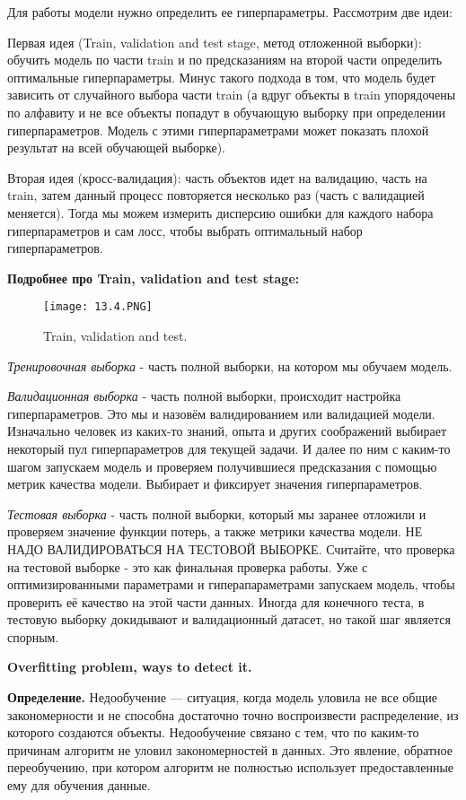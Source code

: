 Для работы модели нужно определить ее гиперпараметры. Рассмотрим две идеи: 

Первая идея (Train, validation and test stage, метод отложенной выборки): обучить модель по части train и по предсказаниям на второй части определить оптимальные гиперпараметры. Минус такого подхода в том, что модель будет зависить от случайного выбора части train (а вдруг объекты в train упорядочены по алфавиту и не все объекты попадут в обучающую выборку при определении гиперпараметров. Модель с этими гиперпараметрами может показать плохой результат на всей обучающей выборке).

Вторая идея (кросс-валидация): часть объектов идет на валидацию, часть на train, затем
данный процесс повторяется несколько раз (часть с валидацией меняется). Тогда мы можем измерить
дисперсию ошибки для каждого набора гиперпараметров и сам лосс, чтобы выбрать оптимальный набор гиперпараметров.

\textbf{Подробнее про Train, validation and test stage:}

\begin{figure}[h]
\centering
\texttt{[image: 13.4.PNG]}
\caption{Train, validation and test.}
\end{figure}

\textit{Тренировочная выборка} - часть полной выборки, на котором мы обучаем модель. 

\textit{Валидационная выборка} - часть полной выборки, происходит настройка гиперпараметров. Это мы и назовём валидированием или валидацией модели. Изначально человек из каких-то знаний, опыта и других соображений выбирает некоторый пул гиперпараметров для текущей задачи. И далее по ним с каким-то шагом запускаем модель и проверяем получившиеся
предсказания с помощью метрик качества модели. Выбирает и фиксирует значения гиперпараметров.

\textit{Тестовая выборка} - часть полной выборки, который мы заранее отложили и проверяем значение функции потерь, а также метрики качества модели.
НЕ НАДО ВАЛИДИРОВАТЬСЯ НА ТЕСТОВОЙ ВЫБОРКЕ. Считайте, что проверка на тестовой выборке - это как финальная проверка работы. Уже с оптимизированными параметрами и гиперапараметрами запускаем модель, чтобы проверить её качество на этой части данных. Иногда для конечного теста, в тестовую выборку докидывают и валидационный датасет, но такой шаг является спорным.

\textbf{Overfitting problem, ways to detect it.}

\textbf{Определение.} Недообучение — ситуация, когда модель уловила не все общие закономерности и не способна достаточно точно воспроизвести распределение, из которого создаются объекты. Недообучение связано с тем, что по каким-то причинам алгоритм не уловил закономерностей в данных. Это явление, обратное переобучению, при котором алгоритм не полностью использует предоставленные ему для обучения данные.

